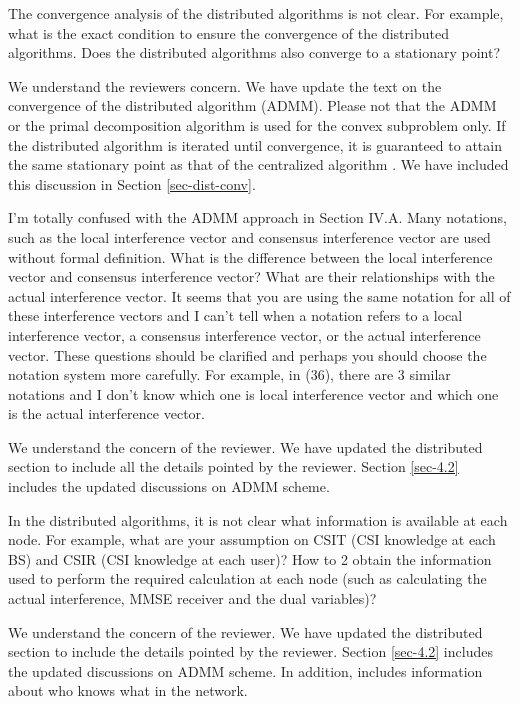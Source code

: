 \begin{itemize}
 The convergence analysis of the distributed algorithms is not clear. For example, what is the exact condition to ensure the convergence of the distributed algorithms. Does the distributed algorithms also converge to a stationary point?

\resp We understand the reviewers concern. We have update the text on the convergence of the distributed algorithm (ADMM). Please not that the ADMM or the primal decomposition algorithm is used for the convex subproblem only. If the distributed algorithm is iterated until convergence, it is guaranteed to attain the same stationary point as that of the centralized algorithm \cite{boyd2011distributed}. We have included this discussion in Section \ref{sec-dist-conv}.

 I’m totally confused with the ADMM approach in Section IV.A. Many notations, such as the local interference vector and consensus interference vector are used without formal definition. What is the difference between the local interference vector and consensus interference vector? What are their relationships with the actual interference vector. It seems that you are using the same notation for all of these interference vectors and I can’t tell when a notation refers to a local interference vector, a consensus interference vector, or the actual interference vector. These questions should be clarified and perhaps you should choose the notation system more carefully. For example, in (36), there are 3 similar notations and I don’t know which one is local interference vector and which one is the actual interference vector.

\resp We understand the concern of the reviewer. We have updated the distributed section to include all the details pointed by the reviewer. Section \ref{sec-4.2} includes the updated discussions on ADMM scheme.

 In the distributed algorithms, it is not clear what information is available at each node. For example, what are your assumption on CSIT (CSI knowledge at each BS) and CSIR (CSI knowledge at each user)? How to 2 obtain the information used to perform the required calculation at each node (such as calculating the actual interference, MMSE receiver and the dual variables)?

\resp We understand the concern of the reviewer. We have updated the distributed section to include the details pointed by the reviewer. Section \ref{sec-4.2} includes the updated discussions on ADMM scheme. In addition,  includes information about who knows what in the network.


\end{itemize}
